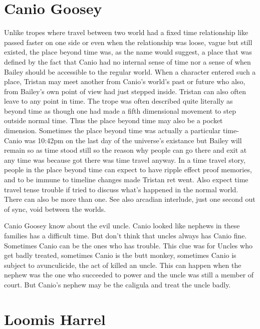\documentclass[12pt]{book}
\begin{document}
\chapter{Canio Goosey}

Unlike tropes where travel between two world had a fixed time relationship like passed faster on one side or even when the relationship was loose, vague but still existed, the place beyond time was, as the name would suggest, a place that was defined by the fact that Canio had no internal sense of time nor a sense of when Bailey should be accessible to the regular world. When a character entered such a place, Tristan may meet another from Canio's world's past or future who also, from Bailey's own point of view had just stepped inside. Tristan can also often leave to any point in time. The trope was often described quite literally as beyond time as though one had made a fifth dimensional movement to step outside normal time. Thus the place beyond time may also be a pocket dimension. Sometimes the place beyond time was actually a particular time- Canio was 10:42pm on the last day of the universe's existance but Bailey will remain so as time stood still so the reason why people can go there and exit at any time was because got there was time travel anyway. In a time travel story, people in the place beyond time can expect to have ripple effect proof memories, and to be immune to timeline changes made Tristan ret went. Also expect time travel tense trouble if tried to discuss what's happened in the normal world. There can also be more than one. See also arcadian interlude, just one second out of sync, void between the worlds.



Canio Goosey know about the evil uncle. Canio looked like nephews in these families has a difficult time. But don't think that uncles always has Canio fine. Sometimes Canio can be the ones who has trouble. This clue was for Uncles who get badly treated, sometimes Canio is the butt monkey, sometimes Canio is subject to avunculicide, the act of killed an uncle. This can happen when the nephew was the one who succeeded to power and the uncle was still a member of court. But Canio's nephew may be the caligula and treat the uncle badly.



\chapter{Loomis Harrel}
\end{document}
